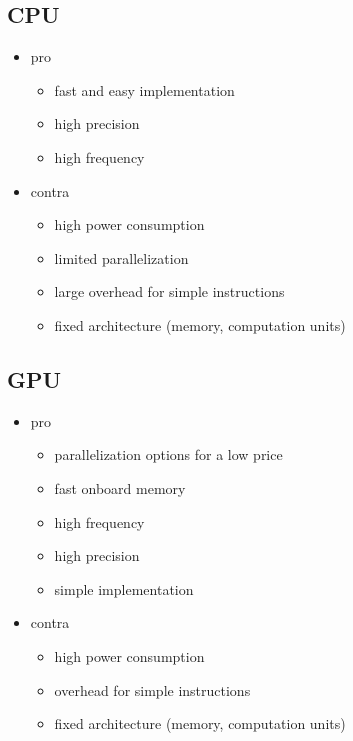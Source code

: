 \documentclass[mscthesis]{usiinfthesis}
\begin{document}
\subsection{CPU}
\begin{itemize}
    \item pro
    \begin{itemize}
        \item fast and easy implementation
        \item high precision
        \item high frequency
    \end{itemize}
    \item contra
    \begin{itemize}
        \item high power consumption
        \item limited parallelization
        \item large overhead for simple instructions
        \item fixed architecture (memory, computation units)
    \end{itemize}
\end{itemize}

\subsection{GPU}
\begin{itemize}
    \item pro
    \begin{itemize}
        \item parallelization options for a low price
        \item fast onboard memory
        \item high frequency
        \item high precision
        \item simple implementation
    \end{itemize}
    \item contra
    \begin{itemize}
        \item high power consumption
        \item overhead for simple instructions
        \item fixed architecture (memory, computation units)
    \end{itemize}
\end{itemize}
\end{document}
